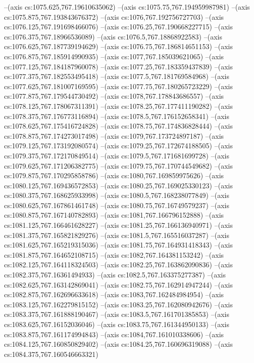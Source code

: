 --(axis cs:1075.625,767.19610635062)
--(axis cs:1075.75,767.194959987981)
--(axis cs:1075.875,767.193843676372)
--(axis cs:1076,767.192756727703)
--(axis cs:1076.125,767.191698466076)
--(axis cs:1076.25,767.190668227715)
--(axis cs:1076.375,767.18966536089)
--(axis cs:1076.5,767.18868922583)
--(axis cs:1076.625,767.187739194629)
--(axis cs:1076.75,767.186814651153)
--(axis cs:1076.875,767.185914990935)
--(axis cs:1077,767.185039621065)
--(axis cs:1077.125,767.184187960078)
--(axis cs:1077.25,767.183359437839)
--(axis cs:1077.375,767.182553495418)
--(axis cs:1077.5,767.181769584968)
--(axis cs:1077.625,767.181007169595)
--(axis cs:1077.75,767.180265723229)
--(axis cs:1077.875,767.179544730492)
--(axis cs:1078,767.178843686557)
--(axis cs:1078.125,767.178067311391)
--(axis cs:1078.25,767.177411190282)
--(axis cs:1078.375,767.176773116894)
--(axis cs:1078.5,767.176152658341)
--(axis cs:1078.625,767.175416724828)
--(axis cs:1078.75,767.174836828444)
--(axis cs:1078.875,767.174273017498)
--(axis cs:1079,767.173724897187)
--(axis cs:1079.125,767.173192080574)
--(axis cs:1079.25,767.172674188505)
--(axis cs:1079.375,767.172170849514)
--(axis cs:1079.5,767.171681699728)
--(axis cs:1079.625,767.171206382775)
--(axis cs:1079.75,767.170744549682)
--(axis cs:1079.875,767.170295858786)
--(axis cs:1080,767.169859975626)
--(axis cs:1080.125,767.169436572853)
--(axis cs:1080.25,767.169025330123)
--(axis cs:1080.375,767.168625933998)
--(axis cs:1080.5,767.168238077849)
--(axis cs:1080.625,767.167861461748)
--(axis cs:1080.75,767.16749579237)
--(axis cs:1080.875,767.167140782893)
--(axis cs:1081,767.166796152888)
--(axis cs:1081.125,767.166461628227)
--(axis cs:1081.25,767.166136940971)
--(axis cs:1081.375,767.165821829276)
--(axis cs:1081.5,767.165516037287)
--(axis cs:1081.625,767.165219315036)
--(axis cs:1081.75,767.164931418343)
--(axis cs:1081.875,767.164652108715)
--(axis cs:1082,767.164381153242)
--(axis cs:1082.125,767.164118324503)
--(axis cs:1082.25,767.163862090836)
--(axis cs:1082.375,767.16361494933)
--(axis cs:1082.5,767.163375277387)
--(axis cs:1082.625,767.163142869041)
--(axis cs:1082.75,767.162914947244)
--(axis cs:1082.875,767.162696633618)
--(axis cs:1083,767.162484984954)
--(axis cs:1083.125,767.162279815152)
--(axis cs:1083.25,767.162080942676)
--(axis cs:1083.375,767.161888190467)
--(axis cs:1083.5,767.161701385853)
--(axis cs:1083.625,767.16152036046)
--(axis cs:1083.75,767.161344950133)
--(axis cs:1083.875,767.161174994843)
--(axis cs:1084,767.161010338606)
--(axis cs:1084.125,767.160850829402)
--(axis cs:1084.25,767.160696319088)
--(axis cs:1084.375,767.160546663321)

